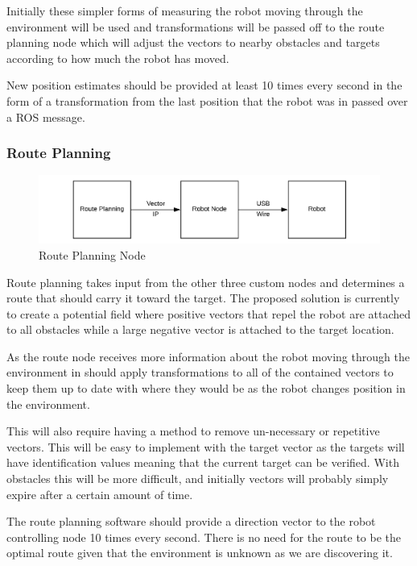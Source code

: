 \documentclass{article}
\begin{document}
	Initially these simpler forms of measuring the robot moving through the environment will be used and transformations will be passed off to the route planning node which will adjust the vectors to nearby obstacles and targets according to how much the robot has moved. 
	
	New position estimates should be provided at least 10 times every second in the form of a transformation from the last position that the robot was in passed over a ROS message.

	\subsubsection{Route Planning}
	
	\begin{figure}[H]
		\centering
		\includegraphics[width=0.9\linewidth]{Route-Planning-Robot}
		\caption{Route Planning Node}
		\label{fig:routeplanning}
	\end{figure}

	Route planning takes input from the other three custom nodes and determines a route that should carry it toward the target. The proposed solution is currently to create a potential field where positive vectors that repel the robot are attached to all obstacles while a large negative vector is attached to the target location.
	
	As the route node receives more information about the robot moving through the environment in should apply transformations to all of the contained vectors to keep them up to date with where they would be as the robot changes position in the environment. 
	
	This will also require having a method to remove un-necessary or repetitive vectors. This will be easy to implement with the target vector as the targets will have identification values meaning that the current target can be verified. With obstacles this will be more difficult, and initially vectors will probably simply expire after a certain amount of time. 
	
	The route planning software should provide a direction vector to the robot controlling node 10 times every second. There is no need for the route to be the optimal route given that the environment is unknown as we are discovering it.
\end{document}
